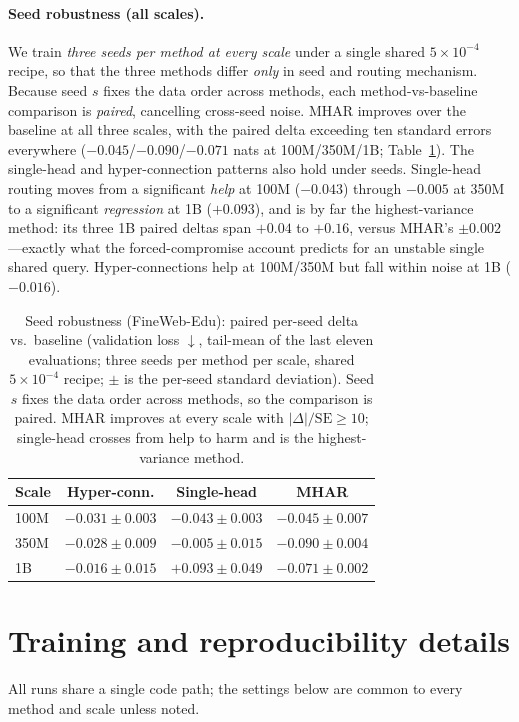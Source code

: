 \documentclass{article}
\begin{document}
\paragraph{Seed robustness (all scales).} We train \emph{three seeds per method at
every scale} under a single shared $5\times10^{-4}$ recipe, so that the three
methods differ \emph{only} in seed and routing mechanism. Because seed $s$ fixes the data
order across methods, each method-vs-baseline comparison is \emph{paired},
cancelling cross-seed noise. MHAR improves over the baseline at all three scales,
with the paired delta exceeding ten standard errors everywhere
($-0.045$/$-0.090$/$-0.071$ nats at 100M/350M/1B; Table~\ref{tab:seeds}). The
single-head and hyper-connection patterns also hold under seeds. Single-head routing
moves from a significant \emph{help} at 100M ($-0.043$) through $-0.005$ at 350M
to a significant \emph{regression} at 1B ($+0.093$), and is by far the
highest-variance method: its three 1B paired deltas span $+0.04$ to $+0.16$, versus
MHAR's $\pm0.002$---exactly what the forced-compromise account predicts for an
unstable single shared query. Hyper-connections help at 100M/350M but fall within
noise at 1B ($-0.016$).

\begin{table}[h]
\centering
\caption{Seed robustness (FineWeb-Edu): paired per-seed delta vs.\ baseline (validation loss
$\downarrow$, tail-mean of the last eleven evaluations; three seeds per method per
scale, shared $5\times10^{-4}$ recipe; $\pm$ is the per-seed standard deviation).
Seed $s$ fixes the data order across methods, so the comparison is paired. MHAR
improves at every scale with $|\Delta|/\text{SE}\ge 10$; single-head crosses from
help to harm and is the highest-variance method.}
\label{tab:seeds}
\begin{tabular}{lccc}
\toprule
\textbf{Scale} & \textbf{Hyper-conn.} & \textbf{Single-head} & \textbf{MHAR} \\
\midrule
100M & $-0.031 \pm 0.003$ & $-0.043 \pm 0.003$ & $\mathbf{-0.045 \pm 0.007}$ \\
350M & $-0.028 \pm 0.009$ & $-0.005 \pm 0.015$ & $\mathbf{-0.090 \pm 0.004}$ \\
1B   & $-0.016 \pm 0.015$ & $+0.093 \pm 0.049$ & $\mathbf{-0.071 \pm 0.002}$ \\
\bottomrule
\end{tabular}
\end{table}

\section{Training and reproducibility details}
\label{app:repro}
All runs share a single code path; the settings below are common to every method
and scale unless noted.
\end{document}
